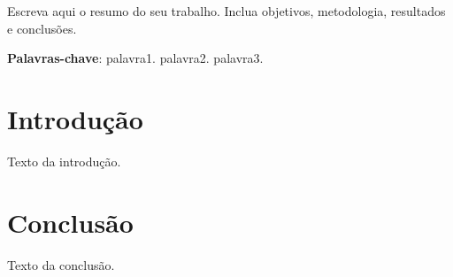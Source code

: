 \documentclass[
    12pt,                %
    openright,           %
    oneside,             %
    a4paper,             %
    brazil               %
]{abntex2}
\begin{document}
\imprimircapa
\imprimirfolhaderosto*

\begin{resumo}
Escreva aqui o resumo do seu trabalho.  
Inclua objetivos, metodologia, resultados e conclusões.

\vspace{\onelineskip}
\noindent
\textbf{Palavras-chave}: palavra1. palavra2. palavra3.
\end{resumo}

\tableofcontents

\newpage
\listoftables

\newpage
\listoffigures




\chapter{Introdução}
Texto da introdução.






\chapter{Conclusão}

Texto da conclusão.



\end{document}
